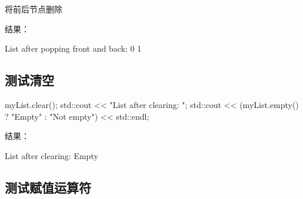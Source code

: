 \documentclass[
]{article}
\newenvironment{Shaded}{}{}
\newcommand{\BuiltInTok}[1]{\textcolor[rgb]{0.00,0.50,0.00}{#1}}
\newcommand{\NormalTok}[1]{#1}
\newcommand{\OperatorTok}[1]{\textcolor[rgb]{0.40,0.40,0.40}{#1}}
\newcommand{\StringTok}[1]{\textcolor[rgb]{0.25,0.44,0.63}{#1}}
\begin{document}
将前后节点删除

结果：

\begin{Shaded}
\begin{Highlighting}[]
\NormalTok{List after popping front and back: 0 1}
\end{Highlighting}
\end{Shaded}

\hypertarget{ux6d4bux8bd5ux6e05ux7a7a}{%
\subsection{测试清空}\label{ux6d4bux8bd5ux6e05ux7a7a}}

\begin{Shaded}
\begin{Highlighting}[]
\NormalTok{myList}\OperatorTok{.}\NormalTok{clear}\OperatorTok{();}
\BuiltInTok{std::}\NormalTok{cout}\OperatorTok{ \textless{}\textless{}} \StringTok{"List after clearing: "}\OperatorTok{;}
\BuiltInTok{std::}\NormalTok{cout}\OperatorTok{ \textless{}\textless{}} \OperatorTok{(}\NormalTok{myList}\OperatorTok{.}\NormalTok{empty}\OperatorTok{()} \OperatorTok{?} \StringTok{"Empty"} \OperatorTok{:} \StringTok{"Not empty"}\OperatorTok{)} \OperatorTok{\textless{}\textless{}} \BuiltInTok{std::}\NormalTok{endl}\OperatorTok{;}
\end{Highlighting}
\end{Shaded}

结果：

\begin{Shaded}
\begin{Highlighting}[]
\NormalTok{List after clearing: Empty}
\end{Highlighting}
\end{Shaded}

\hypertarget{ux6d4bux8bd5ux8d4bux503cux8fd0ux7b97ux7b26}{%
\subsection{测试赋值运算符}\label{ux6d4bux8bd5ux8d4bux503cux8fd0ux7b97ux7b26}}
\end{document}
